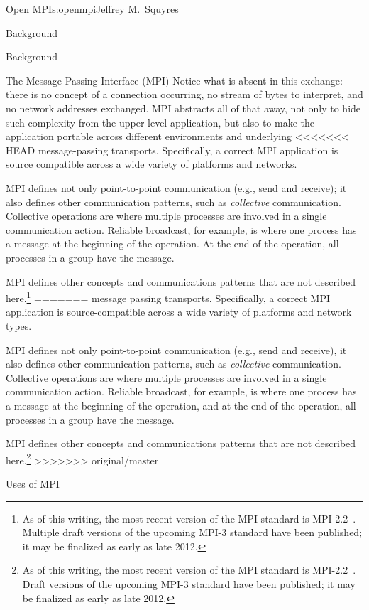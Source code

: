 \begin{aosachapter}{Open MPI}{s:openmpi}{Jeffrey M.\ Squyres}
\begin{aosasect1}{Background}
\begin{aosasect1}{Background}
\begin{aosasect2}{The Message Passing Interface (MPI)}
Notice what is absent in this exchange: there is no concept of a
connection occurring, no stream of bytes to interpret, and no network
addresses exchanged.  MPI abstracts all of that away, not only to hide
such complexity from the upper-level application, but also to make the
application portable across different environments and underlying
<<<<<<< HEAD
message-passing transports.  Specifically, a correct MPI application
is source compatible across a wide variety of platforms and networks.

MPI defines not only point-to-point communication (e.g., send and
receive); it also defines other communication patterns, such as {\em
  collective} communication.  Collective operations are where multiple
processes are involved in a single communication action.  Reliable
broadcast, for example, is where one process has a message at the
beginning of the operation. At the end of the operation, all processes
in a group have the message.

MPI defines other concepts and communications patterns that are not
described here.\footnote{As of this writing, the most recent version
  of the MPI standard is MPI-2.2~\cite{mpi-2.2}.  Multiple draft
  versions of the upcoming MPI-3 standard have been published; it may
  be finalized as early as late 2012.}
=======
message passing transports.  Specifically, a correct MPI application
is source-compatible across a wide variety of platforms and network
types.

MPI defines not only point-to-point communication (e.g., send and
receive), it also defines other communication patterns, such as
\emph{collective} communication.  Collective operations are where
multiple processes are involved in a single communication action.
Reliable broadcast, for example, is where one process has a message at
the beginning of the operation, and at the end of the operation, all
processes in a group have the message.

MPI defines other concepts and communications patterns that are not
described here.\footnote{As of this writing, the most recent version
  of the MPI standard is MPI-2.2~\cite{bib:mpi-22}.  Draft versions of
  the upcoming MPI-3 standard have been published; it may be finalized
  as early as late 2012.}
>>>>>>> original/master

\end{aosasect2}


\begin{aosasect2}{Uses of MPI}


\end{aosasect2}
\end{aosasect1}
\end{aosasect1}
\end{aosachapter}
